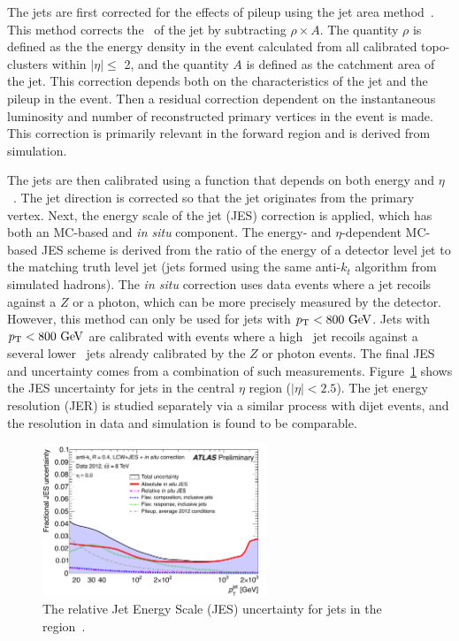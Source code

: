 The jets are first corrected for the effects of pileup using the jet area method~\cite{JES}. This method corrects the \pt\ of the jet by subtracting $\rho\times A$. The quantity $\rho$ is defined as the  the energy density in the event calculated from all calibrated topo-clusters within $|\eta|\leq$ 2, and the quantity $A$ is defined as the catchment area of the jet. This correction depends both on the characteristics of the jet and the pileup in the event. Then a residual correction dependent on the instantaneous luminosity and number of reconstructed primary vertices in the event is made. This correction is primarily relevant in the forward region and is derived from simulation.

The jets are then calibrated using a function that depends on both energy and $\eta$~\cite{JES}. The jet direction is corrected so that the jet originates from the primary vertex. Next, the energy scale of the jet (JES) correction is applied, which has both an MC-based and \emph{in situ} component. The energy- and $\eta$-dependent MC-based JES scheme is derived from the ratio of the energy of a detector level jet to the matching truth level jet (jets formed using the same anti-$k_t$ algorithm from simulated hadrons). The \emph{in situ} correction uses data events where a jet recoils against a $Z$ or a photon, which can be more precisely measured by the detector. However, this method can only be used for jets with $\pt<800 \gev$. Jets with $\pt<800 \gev$ are calibrated with events where a high \pt\ jet recoils against a several lower \pt\ jets already calibrated by the $Z$ or photon events. The final JES and uncertainty comes from a combination of such measurements. Figure~\ref{fig:jesex} shows the JES uncertainty for jets in the central $\eta$ region ($|\eta|<2.5$). The jet energy resolution (JER) is studied separately via a similar process with dijet events, and the resolution in data and simulation is found to be comparable.

\begin{figure}[hp]
\centering
\includegraphics[width=0.6\textwidth]{fig/obj/smalljesunc.pdf}
\caption{The relative Jet Energy Scale (JES) uncertainty for jets in the region~\cite{JES}.}
\label{fig:jesex}
\end{figure}

